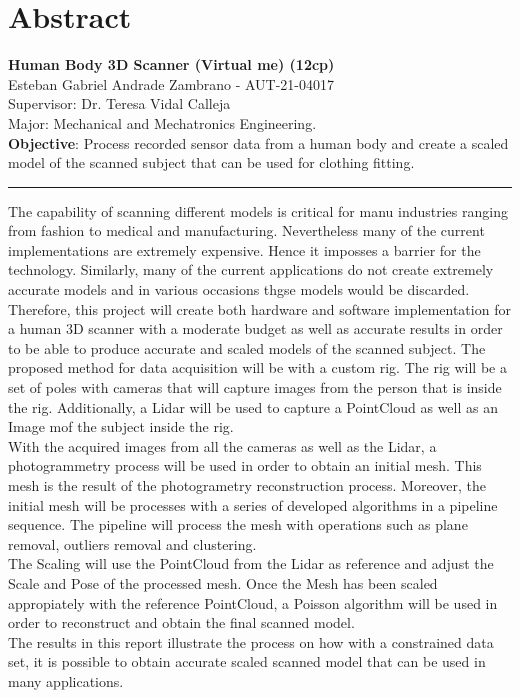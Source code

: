 \documentclass[12pt]{report}
\begin{document}
\chapter*{Abstract}
\textbf{Human Body 3D Scanner (Virtual me) (12cp)}\\
Esteban Gabriel Andrade Zambrano - AUT-21-04017\\
Supervisor: Dr. Teresa Vidal Calleja\\
Major: Mechanical and Mechatronics Engineering.\\
\textbf{Objective}: Process recorded sensor data from a human body and create a scaled model of the scanned subject that can be used for clothing fitting.\\
\rule{\textwidth}{0.1pt}
The capability of scanning different models is critical for manu industries ranging from fashion to medical and manufacturing. Nevertheless many of the current implementations are extremely expensive. Hence it imposses a barrier for the technology.
Similarly, many of the current applications do not create extremely accurate models and in various occasions thgse models would be discarded.\\
Therefore, this project will create both hardware and software implementation for a human 3D scanner with a moderate budget as well as accurate results  in order to be able to produce accurate and scaled models of the scanned subject.
The proposed method for data acquisition will be with a custom rig. The rig will be a set of poles with cameras that will capture images from the person that is inside the rig. 
Additionally, a Lidar will be used to capture a PointCloud as well as an Image mof the subject inside the rig.\\
With the acquired images from all the cameras as well as the Lidar, a photogrammetry process will be used in order to obtain an initial mesh. This mesh is the result of the photogrametry reconstruction process.
Moreover, the initial mesh will be processes with a series of developed algorithms in a pipeline sequence. The pipeline will process the mesh with operations such as plane removal, outliers removal and clustering.\\
The Scaling will use the PointCloud from the Lidar as reference and adjust the Scale and Pose of the processed mesh. Once the Mesh has been scaled appropiately with the reference PointCloud, a Poisson algorithm will be used in order to reconstruct and obtain the final scanned model.\\
The results in this report illustrate the process on how with a constrained data set, it is possible to obtain accurate scaled scanned model that can be used in many applications.
\enlargethispage{\baselineskip}
\end{document}
